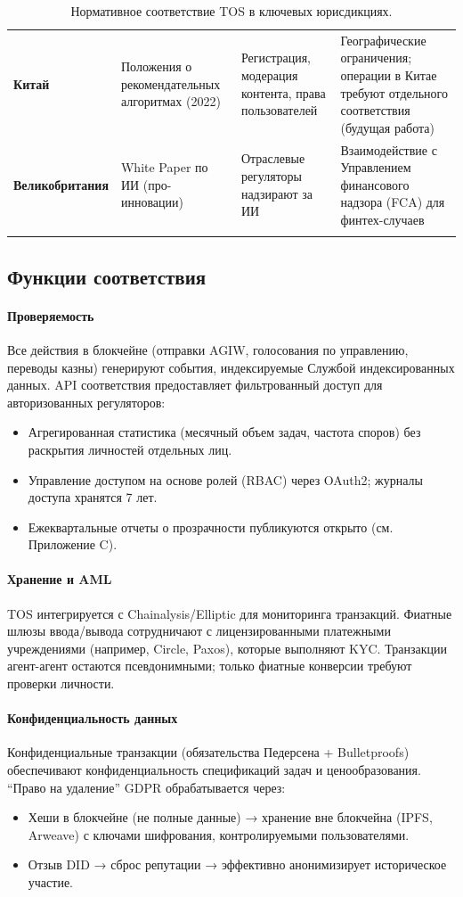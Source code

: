\documentclass[11pt]{article}
\begin{document}
\begin{longtable}{@{}p{}p{}p{}p{}@{}}
\textbf{Китай} & Положения о рекомендательных алгоритмах (2022) & Регистрация, модерация контента, права пользователей & Географические ограничения; операции в Китае требуют отдельного соответствия (будущая работа) \\
\textbf{Великобритания} & White Paper по ИИ (про-инновации) & Отраслевые регуляторы надзирают за ИИ & Взаимодействие с Управлением финансового надзора (FCA) для финтех-случаев \\
\bottomrule
\caption{Нормативное соответствие TOS в ключевых юрисдикциях.}
\end{longtable}

\subsection{Функции соответствия}

\paragraph{Проверяемость}
Все действия в блокчейне (отправки AGIW, голосования по управлению, переводы казны) генерируют события, индексируемые Службой индексированных данных. API соответствия предоставляет фильтрованный доступ для авторизованных регуляторов:
\begin{itemize}[noitemsep]
  \item Агрегированная статистика (месячный объем задач, частота споров) без раскрытия личностей отдельных лиц.
  \item Управление доступом на основе ролей (RBAC) через OAuth2; журналы доступа хранятся 7 лет.
  \item Ежеквартальные отчеты о прозрачности публикуются открыто (см. Приложение C).
\end{itemize}

\paragraph{Хранение и AML}
TOS интегрируется с Chainalysis/Elliptic для мониторинга транзакций. Фиатные шлюзы ввода/вывода сотрудничают с лицензированными платежными учреждениями (например, Circle, Paxos), которые выполняют KYC. Транзакции агент-агент остаются псевдонимными; только фиатные конверсии требуют проверки личности.

\paragraph{Конфиденциальность данных}
Конфиденциальные транзакции (обязательства Педерсена + Bulletproofs) обеспечивают конфиденциальность спецификаций задач и ценообразования. ``Право на удаление'' GDPR обрабатывается через:
\begin{itemize}[noitemsep]
  \item Хеши в блокчейне (не полные данные) → хранение вне блокчейна (IPFS, Arweave) с ключами шифрования, контролируемыми пользователями.
  \item Отзыв DID → сброс репутации → эффективно анонимизирует историческое участие.
\end{itemize}
\end{document}
